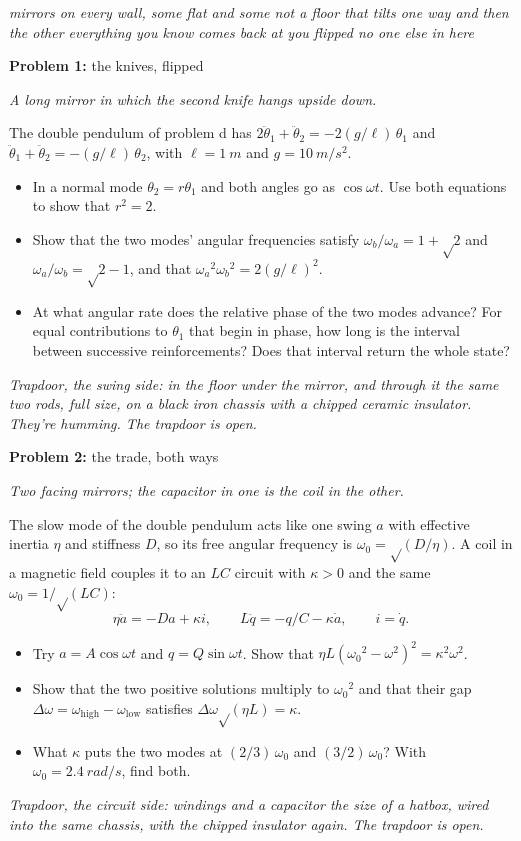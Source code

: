 \documentclass[11pt]{article}
\newcommand{\scene}[1]{\par{\itshape #1}\par}
\newcommand{\problem}[2]{\par\medskip\textbf{Problem #1:} #2\par\nopagebreak}
\newcommand{\appx}[2]{\clearpage{\Large\bfseries Appendix #1: #2}\par\medskip}
\newenvironment{parts}{\begin{itemize}[leftmargin=3.4em,labelwidth=2.8em,labelsep=0.6em,align=left,itemsep=3pt,topsep=4pt]}{\end{itemize}}
\newcommand{\pt}[1]{\item[\textbf{#1}]}
\newcommand{\rt}{\text{√}}  %
\begin{document}
\appx{2}{the funhouse}
\scene{mirrors on every wall, some flat and some not a floor that tilts one way and then the other everything you know comes back at you flipped no one else in here}

\problem{1}{the knives, flipped}
\scene{A long mirror in which the second knife hangs upside down.}
The double pendulum of problem d has $2\ddot\theta_1 + \ddot\theta_2 = -2(g/\ell)\,\theta_1$ and $\ddot\theta_1 + \ddot\theta_2 = -(g/\ell)\,\theta_2$, with $\ell = \SI{1}{m}$ and $g = \SI{10}{m/s^2}$.
\begin{parts}
\pt{1-$\alpha$} In a normal mode $\theta_2 = r\theta_1$ and both angles go as $\cos\omega t$. Use both equations to show that $r^2 = 2$.
\pt{1-$\beta$} Show that the two modes' angular frequencies satisfy $\omega_b/\omega_a = 1 + \rt2$ and $\omega_a/\omega_b = \rt2 - 1$, and that $\omega_a{}^2\omega_b{}^2 = 2(g/\ell)^2$.
\pt{1-$\gamma$} At what angular rate does the relative phase of the two modes advance? For equal contributions to $\theta_1$ that begin in phase, how long is the interval between successive reinforcements? Does that interval return the whole state?
\end{parts}
\scene{Trapdoor, the swing side: in the floor under the mirror, and through it the same two rods, full size, on a black iron chassis with a chipped ceramic insulator. They're humming. The trapdoor is open.}

\problem{2}{the trade, both ways}
\scene{Two facing mirrors; the capacitor in one is the coil in the other.}
The slow mode of the double pendulum acts like one swing $a$ with effective inertia $\eta$ and stiffness $D$, so its free angular frequency is $\omega_0 = \rt(D/\eta)$. A coil in a magnetic field couples it to an $LC$ circuit with $\kappa > 0$ and the same $\omega_0 = 1/\rt(LC)$:
\[ \eta\ddot a = -Da + \kappa i, \qquad L\ddot q = -q/C - \kappa\dot a, \qquad i = \dot q. \]
\begin{parts}
\pt{2-$\alpha$} Try $a = A\cos\omega t$ and $q = Q\sin\omega t$. Show that $\eta L(\omega_0{}^2 - \omega^2)^2 = \kappa^2\omega^2$.
\pt{2-$\beta$} Show that the two positive solutions multiply to $\omega_0{}^2$ and that their gap $\Delta\omega = \omega_{\mathrm{high}} - \omega_{\mathrm{low}}$ satisfies $\Delta\omega\rt(\eta L) = \kappa$.
\pt{2-$\gamma$} What $\kappa$ puts the two modes at $(2/3)\,\omega_0$ and $(3/2)\,\omega_0$? With $\omega_0 = \SI{2.4}{rad/s}$, find both.
\end{parts}
\scene{Trapdoor, the circuit side: windings and a capacitor the size of a hatbox, wired into the same chassis, with the chipped insulator again. The trapdoor is open.}
\end{document}

